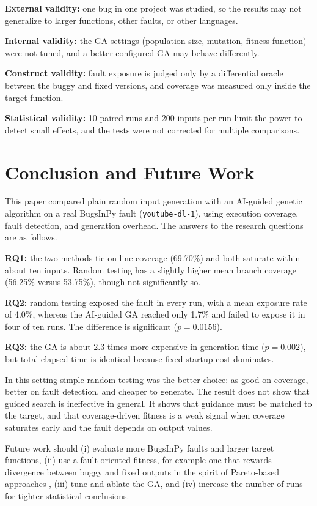 \documentclass[12pt,onecolumn]{IEEEtran}
\begin{document}
\textbf{External validity:} one bug in one project was studied, so the results may not generalize to larger functions, other faults, or other languages.

\textbf{Internal validity:} the GA settings (population size, mutation, fitness function) were not tuned, and a better configured GA may behave differently.

\textbf{Construct validity:} fault exposure is judged only by a differential oracle between the buggy and fixed versions, and coverage was measured only inside the target function.

\textbf{Statistical validity:} 10 paired runs and 200 inputs per run limit the power to detect small effects, and the tests were not corrected for multiple comparisons.

\section{Conclusion and Future Work}

This paper compared plain random input generation with an AI-guided genetic algorithm on a real BugsInPy fault (\texttt{youtube-dl-1}), using execution coverage, fault detection, and generation overhead. The answers to the research questions are as follows.

\textbf{RQ1:} the two methods tie on line coverage (69.70\%) and both saturate within about ten inputs. Random testing has a slightly higher mean branch coverage (56.25\% versus 53.75\%), though not significantly so.

\textbf{RQ2:} random testing exposed the fault in every run, with a mean exposure rate of 4.0\%, whereas the AI-guided GA reached only 1.7\% and failed to expose it in four of ten runs. The difference is significant ($p=0.0156$).

\textbf{RQ3:} the GA is about 2.3 times more expensive in generation time ($p=0.002$), but total elapsed time is identical because fixed startup cost dominates.

In this setting simple random testing was the better choice: as good on coverage, better on fault detection, and cheaper to generate. The result does not show that guided search is ineffective in general. It shows that guidance must be matched to the target, and that coverage-driven fitness is a weak signal when coverage saturates early and the fault depends on output values.

Future work should (i) evaluate more BugsInPy faults and larger target functions, (ii) use a fault-oriented fitness, for example one that rewards divergence between buggy and fixed outputs in the spirit of Pareto-based approaches \cite{sorokin2025}, (iii) tune and ablate the GA, and (iv) increase the number of runs for tighter statistical conclusions.
\end{document}
